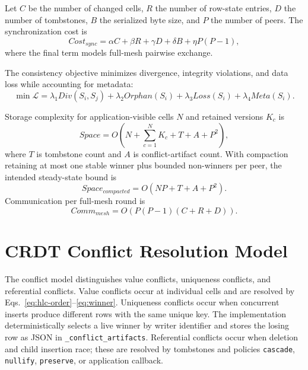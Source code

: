\documentclass[pdflatex,sn-mathphys-num]{sn-jnl}
\begin{document}
Let $C$ be the number of changed cells, $R$ the number of row-state entries, $D$ the number of tombstones, $B$ the serialized byte size, and $P$ the number of peers. The synchronization cost is
\begin{equation}
Cost_{sync}=\alpha C+\beta R+\gamma D+\delta B+\eta P(P-1),
\label{eq:sync-cost}
\end{equation}
where the final term models full-mesh pairwise exchange.

The consistency objective minimizes divergence, integrity violations, and data loss while accounting for metadata:
\begin{equation}
\min \mathcal{L}= \lambda_1 Div(S_i,S_j)+\lambda_2 Orphan(S_i)+\lambda_3 Loss(S_i)+\lambda_4 Meta(S_i).
\label{eq:consistency-objective}
\end{equation}

Storage complexity for application-visible cells $N$ and retained versions $K_c$ is
\begin{equation}
Space=O\left(N+\sum_{c=1}^{N}K_c+T+A+P^2\right),
\label{eq:storage-complexity}
\end{equation}
where $T$ is tombstone count and $A$ is conflict-artifact count. With compaction retaining at most one stable winner plus bounded non-winners per peer, the intended steady-state bound is
\begin{equation}
Space_{compacted}=O(NP+T+A+P^2).
\label{eq:compacted-storage}
\end{equation}
Communication per full-mesh round is
\begin{equation}
Comm_{mesh}=O(P(P-1)(C+R+D)).
\label{eq:communication-complexity}
\end{equation}

\section{CRDT Conflict Resolution Model}

The conflict model distinguishes value conflicts, uniqueness conflicts, and referential conflicts. Value conflicts occur at individual cells and are resolved by Eqs.~\eqref{eq:hlc-order}--\eqref{eq:winner}. Uniqueness conflicts occur when concurrent inserts produce different rows with the same unique key. The implementation deterministically selects a live winner by writer identifier and stores the losing row as JSON in \texttt{\_conflict\_artifacts}. Referential conflicts occur when deletion and child insertion race; these are resolved by tombstones and policies \texttt{cascade}, \texttt{nullify}, \texttt{preserve}, or application callback.
\end{document}
